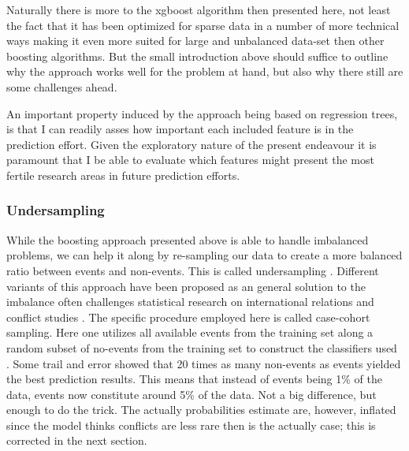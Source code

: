 \documentclass[a4paper]{article}
\begin{document}

Naturally there is more to the xgboost algorithm then presented here, not least the fact that it has been optimized for sparse data in a number of more technical ways making it even more suited for large and unbalanced data-set then other boosting algorithms\cite[5]{Chen_2016}. But the small introduction above should suffice to outline why the approach works well for the problem at hand, but also why there still are some challenges ahead. \par

An important property induced by the approach being based on regression trees, is that I can readily asses how important each included feature is in the prediction effort. Given the exploratory nature of the present endeavour it is paramount that I be able to evaluate which features might present the most fertile research areas in future prediction efforts.\par

\subsubsection{Undersampling}

While the boosting approach presented above is able to handle imbalanced problems, we can help it along by re-sampling our data to create a more balanced ratio between events and non-events. This is called undersampling \citep[1266-1267]{He_2008}. Different variants of this approach have been proposed as an general solution to the imbalance often challenges statistical research on international relations and conflict studies \cite{King_Zeng_2001, king_zeng_2001b}. The specific procedure employed here is called case-cohort sampling. Here one utilizes all available events from the training set along a random subset of no-events from the training set to construct the classifiers used \citep[142]{King_Zeng_2001}. Some trail and error showed that 20 times as many non-events as events yielded the best prediction results. This means that instead of events being 1\% of the data, events now constitute around 5\% of the data. Not a big difference, but enough to do the trick. The actually probabilities estimate are, however, inflated since the model thinks conflicts are less rare then is the actually case; this is corrected in the next section.\par
\end{document}
